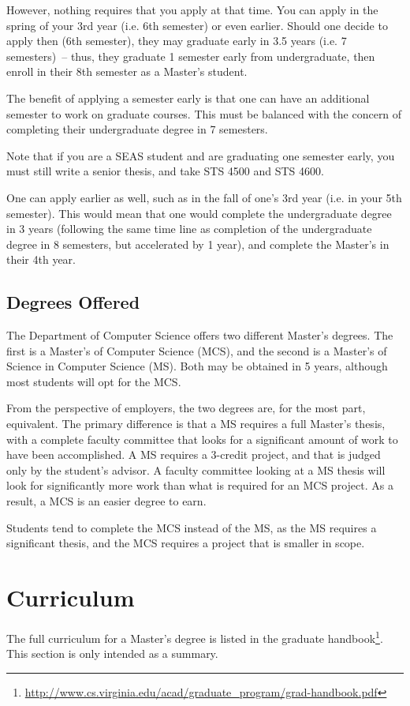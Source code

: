 \documentclass[10pt,letter]{book}
\newcommand{\mysection}[1]{\section{#1}\renewcommand{\rightmark}{#1}}
\newcommand{\myurl}[1]{\footnote{\scriptsize\url{#1}}}
\begin{document}
However, nothing requires that you apply at that time.  You can apply
in the spring of your 3rd year (i.e. 6th semester) or even earlier.
Should one decide to apply then (6th semester), they may graduate
early in 3.5 years (i.e. 7 semesters)~-- thus, they graduate 1
semester early from undergraduate, then enroll in their 8th semester
as a Master's student.

The benefit of applying a semester early is that one can have an
additional semester to work on graduate courses.  This must be
balanced with the concern of completing their undergraduate degree in
7 semesters.

Note that if you are a SEAS student and are graduating one semester
early, you must still write a senior thesis, and take STS 4500 and STS
4600.

One can apply earlier as well, such as in the fall of one's 3rd year
(i.e. in your 5th semester).  This would mean that one would complete
the undergraduate degree in 3 years (following the same time line as
completion of the undergraduate degree in 8 semesters, but accelerated
by 1 year), and complete the Master's in their 4th year.


\subsection{Degrees Offered}

The Department of Computer Science offers two different Master's
degrees.  The first is a Master's of Computer Science (MCS), and the
second is a Master's of Science in Computer Science (MS).  Both may be
obtained in 5 years, although most students will opt for the MCS.

From the perspective of employers, the two degrees are, for the most part,
equivalent.  The primary difference is that a MS requires a full
Master's thesis, with a complete faculty committee that looks for a
significant amount of work to have been accomplished.  A MS requires a
3-credit project, and that is judged only by the student's advisor.  A
faculty committee looking at a MS thesis will look for significantly
more work than what is required for an MCS project.  As a result, a
MCS is an easier degree to earn.

Students tend to complete the MCS instead of the MS, as the MS
requires a significant thesis, and the MCS requires a project that is
smaller in scope.


\mysection{Curriculum}

The full curriculum for a Master's degree is listed in the graduate
handbook\myurl{http://www.cs.virginia.edu/acad/graduate_program/grad-handbook.pdf}.
This section is only intended as a summary.
\end{document}
